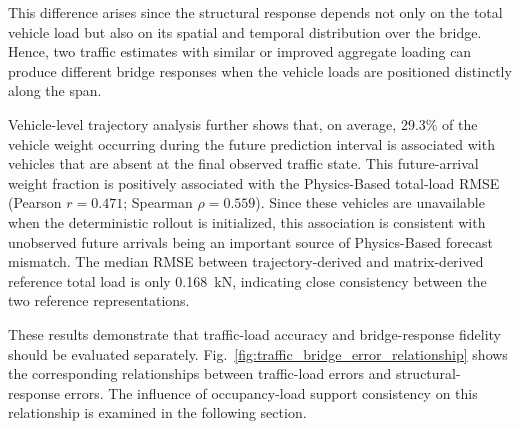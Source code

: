 \documentclass[journal]{IEEEtran}
\begin{document}
This difference arises since
the structural response depends not only on the total vehicle load but also on
its spatial and temporal distribution over the bridge. Hence, two traffic
estimates with similar or improved aggregate loading can produce different
bridge responses when the vehicle loads are positioned distinctly along the
span.

Vehicle-level trajectory analysis further shows that, on average, 29.3\% of the vehicle weight occurring during the future prediction interval is associated with vehicles that are absent at the final observed traffic state. This future-arrival weight fraction is positively associated with the Physics-Based total-load RMSE (Pearson $r=0.471$; Spearman $\rho=0.559$). Since these vehicles are unavailable when the deterministic rollout is initialized, this association is consistent with unobserved future arrivals being an important source of Physics-Based forecast mismatch. The median RMSE between trajectory-derived and matrix-derived reference total load is only 0.168~kN, indicating close consistency between the two reference representations.

These results demonstrate that traffic-load accuracy and bridge-response fidelity should be evaluated separately. Fig.~\ref{fig:traffic_bridge_error_relationship} shows the corresponding relationships between traffic-load errors and structural-response errors. The influence of occupancy-load support consistency on this
relationship is examined in the following section.
\end{document}
